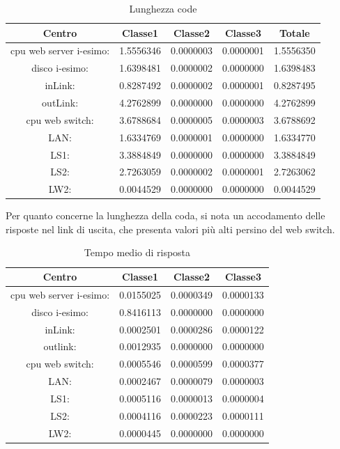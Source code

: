 \begin{table}[H]
\begin{center}
\begin{tabular}{||c|c|c|c|c||}
\hline
Centro &Classe1 &Classe2 &Classe3 &Totale\\
\hline
\hline
 cpu web server i-esimo: 	&1.5556346	&0.0000003	&0.0000001	&1.5556350\\
\hline
 disco i-esimo: 	&1.6398481	&0.0000002	&0.0000000	&1.6398483\\
\hline
 inLink: 	&0.8287492	&0.0000002	&0.0000001	&0.8287495\\
\hline
 outLink: 	&4.2762899	&0.0000000	&0.0000000	&4.2762899\\
\hline
 cpu web switch: 	&3.6788684	&0.0000005	&0.0000003	&3.6788692\\
\hline
 LAN: 	&1.6334769	&0.0000001	&0.0000000	&1.6334770\\
\hline
 LS1: 	&3.3884849	&0.0000000	&0.0000000	&3.3884849\\
\hline
 LS2: 	&2.7263059	&0.0000002	&0.0000001	&2.7263062\\
\hline
 LW2: 	&0.0044529	&0.0000000	&0.0000000	&0.0044529\\
\hline
\end{tabular}
\end{center}
\caption{Lunghezza code}
\label{ris}
\end{table}
Per quanto concerne la lunghezza della coda, si nota un accodamento delle risposte nel link di uscita, che presenta valori più alti persino del web switch.
\begin{table}[htbp]
\caption{Tempo medio di risposta}
\begin{center}
\begin{tabular}{|c|c|c|c|}
\hline
Centro &Classe1 &Classe2 &Classe3\\
\hline
\hline
 cpu web server i-esimo: 	&0.0155025	&0.0000349	&0.0000133\\
\hline
 disco i-esimo: 	&0.8416113	&0.0000000	&0.0000000\\
\hline
 inLink: 	&0.0002501	&0.0000286	&0.0000122\\
\hline
 outlink: 	&0.0012935	&0.0000000	&0.0000000\\
\hline
 cpu web switch: 	&0.0005546	&0.0000599	&0.0000377\\
\hline
 LAN: 	&0.0002467	&0.0000079	&0.0000003\\
\hline
 LS1: 	&0.0005116	&0.0000013	&0.0000004\\
\hline
 LS2: 	&0.0004116	&0.0000223	&0.0000111\\
\hline
 LW2: 	&0.0000445	&0.0000000	&0.0000000\\
\hline
\end{tabular}
\end{center}
\label{tempomediorisposta}
\end{table}
